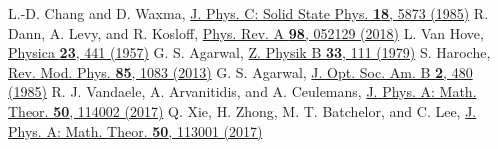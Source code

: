 \documentclass[aps,pra,twocolumn,showpacs,preprintnumbers,amsmath,amssymb,footinbib]{revtex4}
\def\rmp#1#2#3{Rev. Mod. Phys. {\bf #1}, #2 (#3)}
\def\pra#1#2#3{Phys. Rev. A {\bf #1}, #2 (#3)}
\def\jpamt#1#2#3{J. Phys. A: Math. Theor. {\bf #1}, #2 (#3)}
\begin{document}
\begin{thebibliography}{99}
L.-D. Chang and D. Waxma, \href{https://doi.org/10.1088/0022-3719/18/31/019} {J. Phys. C: Solid State Phys. \textbf{18}, 5873 (1985)}
R. Dann, A. Levy, and R. Kosloff, \href{http://dx.doi.org/10.1103/PhysRevA.98.052129}{\pra{98}{052129}{2018}}
L. Van Hove, \href{https://doi.org/10.1016/S0031-8914(57)92891-4}{Physica \textbf{23}, 441 (1957)}
G. S. Agarwal, \href{https://doi.org/10.1007/BF01325819}{Z. Physik B \textbf{33}, 111 (1979)}
S. Haroche, \href{http://dx.doi.org/10.1103/RevModPhys.85.1083}{\rmp{85}{1083}{2013}}
G. S. Agarwal,  \href{https://doi.org/10.1364/JOSAB.2.000480}{J. Opt. Soc. Am. B \textbf{2}, 480 (1985)}
R. J. Vandaele, A. Arvanitidis, and A. Ceulemans, \href{http://dx.doi.org/10.1088/1751-8121/aa5bc2}{\jpamt{50}{114002}{2017}}
Q. Xie, H. Zhong, M. T. Batchelor, and C. Lee,  \href{http://dx.doi.org/10.1088/1751-8121/aa5a65}{\jpamt{50}{113001}{2017}}
\end{thebibliography}
\end{document}
